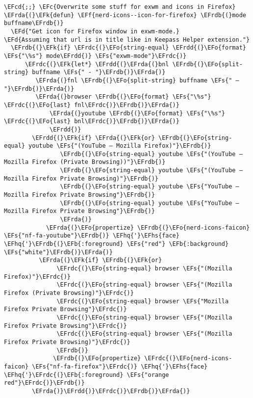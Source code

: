 \documentclass[a4wide,10pt]{article}
\newcommand{\EFc}[1]{\textcolor{EFc}{#1}} %
\newcommand{\EFcd}[1]{\textcolor{EFcd}{#1}} %
\newcommand{\EFs}[1]{\textcolor{EFs}{#1}} %
\newcommand{\EFd}[1]{\textcolor{EFd}{#1}} %
\newcommand{\EFk}[1]{\textcolor{EFk}{#1}} %
\newcommand{\EFb}[1]{\textcolor{EFb}{#1}} %
\newcommand{\EFf}[1]{\textcolor{EFf}{#1}} %
\newcommand{\EFo}[1]{\textcolor{EFo}{#1}} %
\newcommand{\EFhq}[1]{\textcolor{EFhq}{#1}} %
\newcommand{\EFhs}[1]{\textcolor{EFhs}{#1}} %
\newcommand{\EFrda}[1]{\textcolor{EFrda}{#1}} %
\newcommand{\EFrdb}[1]{\textcolor{EFrdb}{#1}} %
\newcommand{\EFrdc}[1]{\textcolor{EFrdc}{#1}} %
\newcommand{\EFrdd}[1]{\textcolor{EFrdd}{#1}} %
\begin{document}
\begin{Code}
\begin{Verbatim}
\EFcd{;;} \EFc{Overwrite some stuff for exwm and icons in Firefox}
\EFrda{(}\EFk{defun} \EFf{nerd-icons--icon-for-firefox} \EFrdb{(}mode buffname\EFrdb{)}
  \EFd{"Get icon for Firefox window in exwm-mode.}
\EFd{Assuming that url is in title like in Keepass Helper extension."}
  \EFrdb{(}\EFk{if} \EFrdc{(}\EFo{string-equal} \EFrdd{(}\EFo{format} \EFs{"\%s"} mode\EFrdd{)} \EFs{"exwm-mode"}\EFrdc{)}
      \EFrdc{(}\EFk{let*} \EFrdd{(}\EFrda{(}bnl \EFrdb{(}\EFo{split-string} buffname \EFs{" - "}\EFrdb{)}\EFrda{)}
	     \EFrda{(}fnl \EFrdb{(}\EFo{split-string} buffname \EFs{" — "}\EFrdb{)}\EFrda{)}
	     \EFrda{(}browser \EFrdb{(}\EFo{format} \EFs{"\%s"} \EFrdc{(}\EFo{last} fnl\EFrdc{)}\EFrdb{)}\EFrda{)}
             \EFrda{(}youtube \EFrdb{(}\EFo{format} \EFs{"\%s"} \EFrdc{(}\EFo{last} bnl\EFrdc{)}\EFrdb{)}\EFrda{)}
             \EFrdd{)}
        \EFrdd{(}\EFk{if} \EFrda{(}\EFk{or} \EFrdb{(}\EFo{string-equal} youtube \EFs{"(YouTube — Mozilla Firefox)"}\EFrdb{)}
                \EFrdb{(}\EFo{string-equal} youtube \EFs{"(YouTube — Mozilla Firefox (Private Browsing))"}\EFrdb{)}
                \EFrdb{(}\EFo{string-equal} youtube \EFs{"(YouTube — Mozilla Firefox Private Browsing)"}\EFrdb{)}
                \EFrdb{(}\EFo{string-equal} youtube \EFs{"YouTube — Mozilla Firefox Private Browsing"}\EFrdb{)}
                \EFrdb{(}\EFo{string-equal} youtube \EFs{"YouTube — Mozilla Firefox Private Browsing"}\EFrdb{)}
                \EFrda{)}
            \EFrda{(}\EFo{propertize} \EFrdb{(}\EFo{nerd-icons-faicon} \EFs{"nf-fa-youtube"}\EFrdb{)} \EFhq{'}\EFhs{face} \EFhq{'}\EFrdb{(}\EFb{:foreground} \EFs{"red"} \EFb{:background} \EFs{"white"}\EFrdb{)}\EFrda{)}
          \EFrda{(}\EFk{if} \EFrdb{(}\EFk{or}
               \EFrdc{(}\EFo{string-equal} browser \EFs{"(Mozilla Firefox)"}\EFrdc{)}
               \EFrdc{(}\EFo{string-equal} browser \EFs{"(Mozilla Firefox (Private Browsing)"}\EFrdc{)}
               \EFrdc{(}\EFo{string-equal} browser \EFs{"Mozilla Firefox Private Browsing"}\EFrdc{)}
               \EFrdc{(}\EFo{string-equal} browser \EFs{"(Mozilla Firefox Private Browsing"}\EFrdc{)}
               \EFrdc{(}\EFo{string-equal} browser \EFs{"(Mozilla Firefox Private Browsing)"}\EFrdc{)}
               \EFrdb{)}
              \EFrdb{(}\EFo{propertize} \EFrdc{(}\EFo{nerd-icons-faicon} \EFs{"nf-fa-firefox"}\EFrdc{)} \EFhq{'}\EFhs{face} \EFhq{'}\EFrdc{(}\EFb{:foreground} \EFs{"orange red"}\EFrdc{)}\EFrdb{)}
	    \EFrda{)}\EFrdd{)}\EFrdc{)}\EFrdb{)}\EFrda{)}


\end{Verbatim}
\end{Code}
\end{document}
